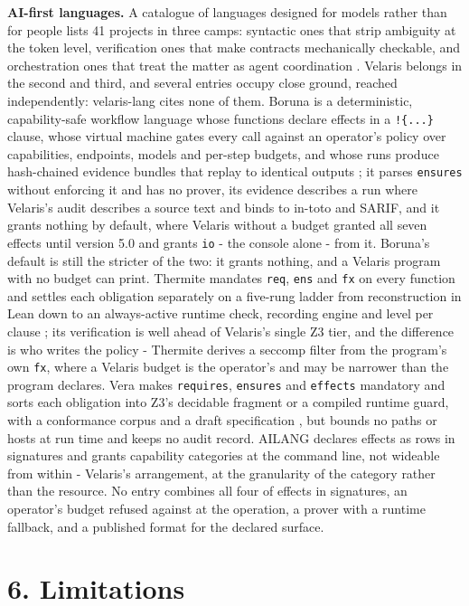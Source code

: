 \documentclass[
]{article}
\newcounter{none} %
\begin{document}
\textbf{AI-first languages.} A catalogue of languages designed for
models rather than for people lists 41 projects in three camps:
syntactic ones that strip ambiguity at the token level, verification
ones that make contracts mechanically checkable, and orchestration ones
that treat the matter as agent coordination \citep{agentlanguages}.
Velaris belongs in the second and third, and several entries occupy
close ground, reached independently: velaris-lang cites none of them.
Boruna is a deterministic, capability-safe workflow language whose
functions declare effects in a \texttt{!\{...\}} clause, whose virtual
machine gates every call against an operator's policy over capabilities,
endpoints, models and per-step budgets, and whose runs produce
hash-chained evidence bundles that replay to identical outputs
\citep{boruna}; it parses \texttt{ensures} without enforcing it and has
no prover, its evidence describes a run where Velaris's audit describes
a source text and binds to in-toto and SARIF, and it grants nothing by
default, where Velaris without a budget granted all seven effects until
version 5.0 and grants \texttt{io} - the console alone - from it.
Boruna's default is still the stricter of the two: it grants nothing,
and a Velaris program with no budget can print. Thermite mandates
\texttt{req}, \texttt{ens} and \texttt{fx} on every function and settles
each obligation separately on a five-rung ladder from reconstruction in
Lean down to an always-active runtime check, recording engine and level
per clause \citep{thermite}; its verification is well ahead of Velaris's
single Z3 tier, and the difference is who writes the policy - Thermite
derives a seccomp filter from the program's own \texttt{fx}, where a
Velaris budget is the operator's and may be narrower than the program
declares. Vera makes \texttt{requires}, \texttt{ensures} and
\texttt{effects} mandatory and sorts each obligation into Z3's decidable
fragment or a compiled runtime guard, with a conformance corpus and a
draft specification \citep{vera}, but bounds no paths or hosts at run
time and keeps no audit record. AILANG declares effects as rows in
signatures and grants capability categories at the command line, not
wideable from within \citep{ailang} - Velaris's arrangement, at the
granularity of the category rather than the resource. No entry combines
all four of effects in signatures, an operator's budget refused against
at the operation, a prover with a runtime fallback, and a published
format for the declared surface.

\section{6. Limitations}\label{limitations}
\end{document}
